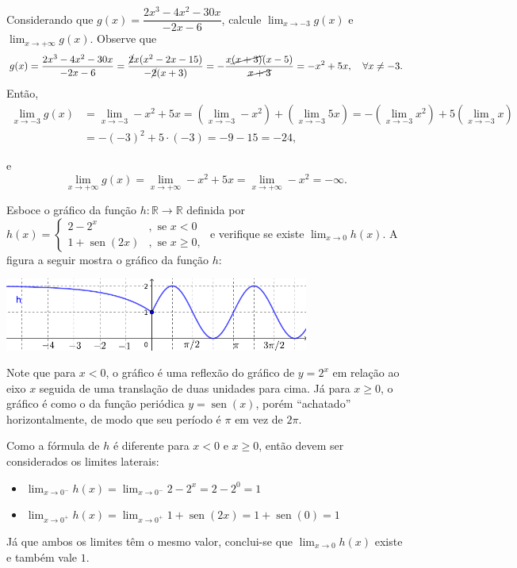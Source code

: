 \documentclass[12pt,a4paper]{article}
\newcommand*\sen{\operatorname{sen}}
\begin{document}
\begin{ExerciseList}
\Exercise[title={2,0}] Considerando que $g(x) = \dfrac{2 x^3 - 4 x^2 - 30 x}{-2 x - 6}$, calcule $\displaystyle\lim_{x\to -3} g(x)$ e $\displaystyle\lim_{x\to +\infty} g(x)$.
\Answer Observe que
\[
  g(x)
  = \frac{2 x^3 - 4 x^2 - 30 x}{-2 x - 6}
  = \frac{\cancel{2}x(x^2 - 2 x - 15)}{-\cancel{2} (x + 3)}
  = -\frac{x\cancel{(x + 3)}(x - 5)}{\cancel{x + 3}}
  = -x^2 +5x, \quad \forall x \neq -3.
\]
Então,
\begin{align*}
  \lim_{x\to -3} g(x)
  & = \lim_{x\to -3} -x^2 +5x
    = \left(\lim_{x\to -3} -x^2\right) + \left(\lim_{x\to -3} 5x\right)
    = -\left(\lim_{x\to -3} x^2\right) + 5\left(\lim_{x\to -3} x\right) \\
  & = -(-3)^2 + 5\cdot(-3)
    = -9 - 15
    = -24,
\end{align*}

e
\[
  \lim_{x\to +\infty} g(x)
  = \lim_{x\to +\infty} -x^2 +5x
  = \lim_{x\to +\infty} -x^2
  = -\infty.
\]

\Exercise[title={2,0}] Esboce o gráfico da função $h:\mathbb{R} \to \mathbb{R}$ definida por $h(x) = \begin{cases}
  2-2^{x}&, \text{ se } x < 0\\
  1+\sen(2x) &, \text{ se } x\geq 0,
\end{cases}$
e verifique se existe $\lim_{x\to 0} h(x)$.
\Answer A figura a seguir mostra o gráfico da função $h$:

\begin{center}
  \includegraphics[width=10.0cm]{img/prova-1-nex-função-por-partes.pdf}
\end{center}

Note que para $x < 0$, o gráfico é uma reflexão do gráfico de $y=2^x$ em relação ao eixo $x$ seguida de uma translação de duas unidades para cima. Já para $x \geq 0$, o gráfico é como o da função periódica $y=\sen(x)$, porém ``achatado'' horizontalmente, de modo que seu período é $\pi$ em vez de $2\pi$.

Como a fórmula de $h$ é diferente para $x < 0$ e $x\geq 0$, então devem ser considerados os limites laterais:
\begin{itemize}
  \item $\lim_{x\to 0^-} h(x) = \lim_{x\to 0^-} 2-2^{x} = 2 - 2^0 = 1$
  \item $\lim_{x\to 0^+} h(x) = \lim_{x\to 0^+} 1 + \sen(2x) = 1 + \sen(0) = 1$
\end{itemize}
Já que ambos os limites têm o mesmo valor, conclui-se que $\lim_{x\to 0} h(x)$ existe e também vale $1$.


\end{ExerciseList}
\end{document}
